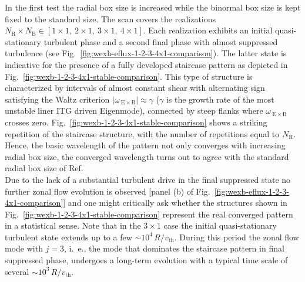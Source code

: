 \documentclass[aip, amsmath, amssymb, reprint, twocolumn]{revtex4-1}
\newcommand{\wexb}{\omega_{\mathrm{\:E \times B}}}
\newcommand{\NR}{N_\mathrm{R}}
\newcommand{\NB}{N_\mathrm{B}}
\newcommand{\vth}{v_{\mathrm{th}}}
\begin{document}
In the first test the radial box size is increased while the binormal box size is kept fixed to the standard size.
The scan covers the realizations $\NR\times\NB \in [ 1\times1,~2\times1,~3\times1,~4\times1]$.
Each realization exhibits an initial quasi-stationary turbulent phase and a second final \cite{peeters2016} phase with almost suppressed turbulence (see Fig.~\ref{fig:wexb-eflux-1-2-3-4x1-comparison}).
The latter state is indicative for the presence of a fully developed staircase pattern as depicted in Fig.~\ref{fig:wexb-1-2-3-4x1-stable-comparison}. 
This type of structure is characterized by intervals of almost constant shear with alternating sign satisfying the Waltz criterion $|\wexb| \approx \gamma$\cite{doi:10.1063/1.870934, doi:10.1063/1.872847} ($\gamma$ is the growth rate of the most unstable liner ITG driven Eigenmode), connected by steep flanks where $\wexb$ crosses zero.
Fig.~\ref{fig:wexb-1-2-3-4x1-stable-comparison} shows a striking repetition of the staircase structure, with the number of repetitions equal to $\NR$.
Hence, the basic wavelength of the pattern not only converges with increasing radial box size, the converged wavelength turns out to agree with the standard radial box size of Ref.~\cite{peeters2016} \\
Due to the lack of a substantial turbulent drive in the final suppressed state no further zonal flow evolution is observed [panel (b) of Fig.~\ref{fig:wexb-eflux-1-2-3-4x1-comparison}] and one might critically ask whether the structures shown in Fig.~\ref{fig:wexb-1-2-3-4x1-stable-comparison} represent the real converged pattern in a statistical sense. 
Note that in the $3 \times 1$ case the initial quasi-stationary turbulent state extends up to a few $\sim 10^4\,R/\vth$.
During this period the zonal flow mode with $j = 3$, i.~e., the mode that dominates the staircase pattern in final suppressed phase, undergoes a long-term evolution with a typical time scale of several $\sim 10^3\,R/\vth$. 
\end{document}
